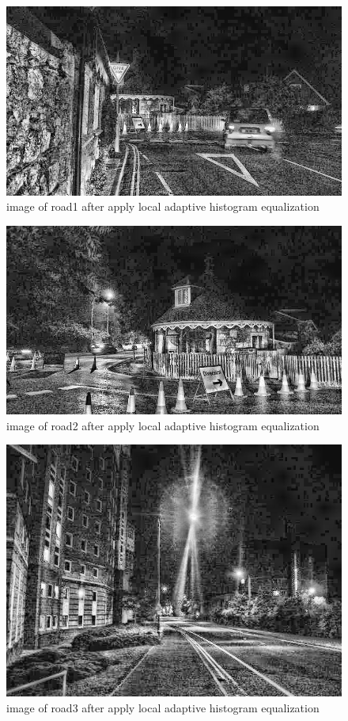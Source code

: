 \documentclass[
	12pt, %
]{fphw}
\begin{document}
\begin{figure}[H]
 
	\centering
	\includegraphics[width=1\columnwidth]{T2/result/I1_local.jpg} 
	\caption{image of road1 after apply local adaptive histogram equalization}
	\label{fig16}
\end{figure}
\begin{figure}[H]
 
	\centering
	\includegraphics[width=1\columnwidth]{T2/result/I2_local.jpg} 
	\caption{image of road2 after apply local adaptive histogram equalization}
	\label{fig17}
\end{figure}
\begin{figure}[H]
 
	\centering
	\includegraphics[width=1\columnwidth]{T2/result/I3_local.jpg} 
	\caption{image of road3 after apply local adaptive histogram equalization}
	\label{fig18}
\end{figure}
\end{document}
